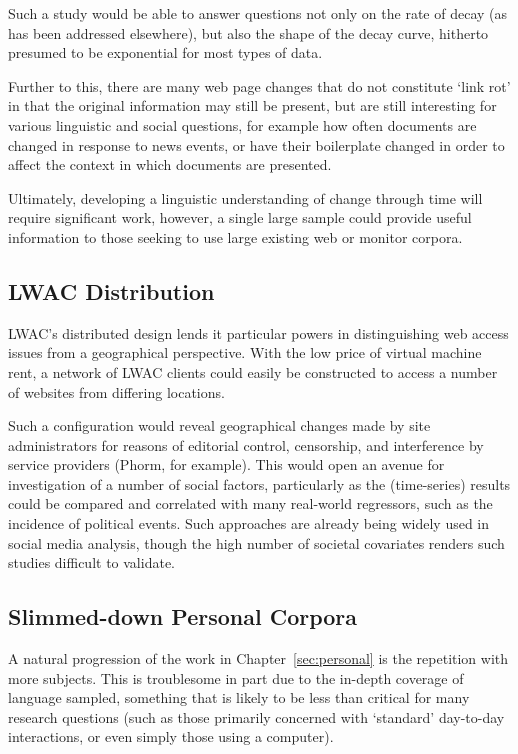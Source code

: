 Such a study would be able to answer questions not only on the rate of decay (as has been addressed elsewhere), but also the shape of the decay curve, hitherto presumed to be exponential for most types of data.

Further to this, there are many web page changes that do not constitute `link rot' in that the original information may still be present, but are still interesting for various linguistic and social questions, for example how often documents are changed in response to news events, or have their boilerplate changed in order to affect the context in which documents are presented.

Ultimately, developing a linguistic understanding of change through time will require significant work, however, a single large sample could provide useful information to those seeking to use large existing web or monitor corpora.

\subsection{LWAC Distribution}
LWAC's distributed design lends it particular powers in distinguishing web access issues from a geographical perspective.  With the low price of virtual machine rent, a network of LWAC clients could easily be constructed to access a number of websites from differing locations.

Such a configuration would reveal geographical changes made by site administrators for reasons of editorial control, censorship, and interference by service providers (Phorm\cite{clayton2008phorm}, for example).  This would open an avenue for investigation of a number of social factors, particularly as the (time-series) results could be compared and correlated with many real-world regressors, such as the incidence of political events.  Such approaches are already being widely used in social media analysis\cite{achrekar2011predicting,bollen2011twitter}, though the high number of societal covariates renders such studies difficult to validate.

\subsection{Slimmed-down Personal Corpora}
A natural progression of the work in Chapter~\ref{sec:personal} is the repetition with more subjects.  This is troublesome in part due to the in-depth coverage of language sampled, something that is likely to be less than critical for many research questions (such as those primarily concerned with `standard' day-to-day interactions, or even simply those using a computer).

